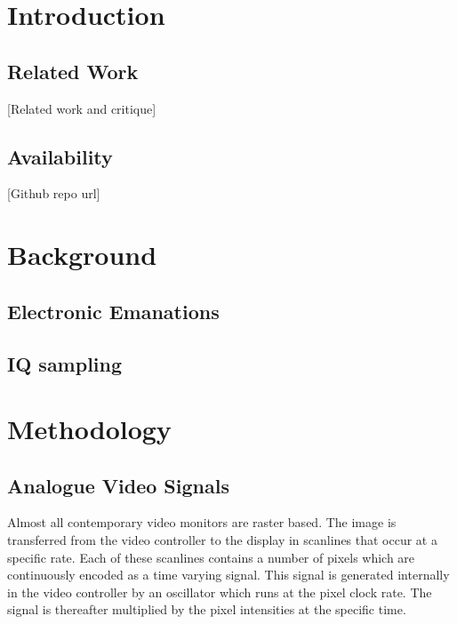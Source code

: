 \documentclass[a4paper,12pt,twoside,openright]{report}
\begin{document}
\pagestyle{empty}
\singlespacing

\onehalfspacing

\singlespacing


\setcounter{page}{0}
\pagestyle{plain}
\tableofcontents

\onehalfspacing


\chapter{Introduction}
\setcounter{page}{1} 

\section{Related Work} 

[Related work and critique]

\section{Availability} 
[Github repo url]

\cite{kuhn2003compromising}

\chapter{Background}

\section{Electronic Emanations} 

\section{IQ sampling} 

\chapter{Methodology} 

\section{Analogue Video Signals}

Almost all contemporary video monitors are raster based. The image is transferred from the video controller to the display in scanlines that occur at a specific rate. Each of these scanlines contains a number of pixels which are continuously encoded as a time varying signal. This signal is generated internally in the video controller by an oscillator which runs at the pixel clock rate. The signal is thereafter multiplied by the pixel intensities at the specific time.
\end{document}
